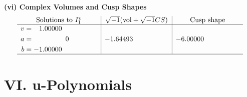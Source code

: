 \documentclass[1p]{elsarticle_modified}
\theoremstyle{definition}
\newcommand{\I}{\sqrt{-1}}
\begin{document}
\newpage\flushleft \textbf{(vi) Complex Volumes and Cusp Shapes}
$$\begin{array}{c|c|c}  
\text{Solutions to }I^v_{1}& \I (\text{vol} + \sqrt{-1}CS) & \text{Cusp shape}\\
 \hline 
\begin{aligned}
v &= \phantom{-}1.00000\phantom{ +0.000000I} \\
a &= \phantom{-0.000000 } 0 \\
b &= -1.00000\phantom{ +0.000000I}\end{aligned}
 & -1.64493\phantom{ +0.000000I} & -6.00000\phantom{ +0.000000I}\\
 \hline 
 \end{array}$$\newpage
\newpage\renewcommand{\arraystretch}{1}
\centering \section*{ VI. u-Polynomials}
\end{document}
